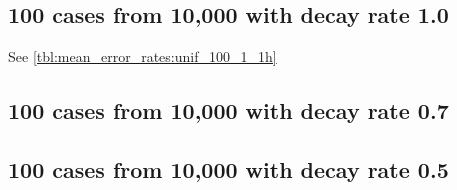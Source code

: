 \subsection{100 cases from 10,000 with decay rate 1.0}

See \autoref{tbl:mean_error_rates:unif_100_1_1h}
\begin{table}[H]
\centering
\scriptsize

    \begin{subtable}{0.5\textwidth}
    
    \caption{Means} 
    \end{subtable}%
    \begin{subtable}{0.5\textwidth}
    
    \caption{Standard deviations} 
    \end{subtable}

\caption{Error rates for uniform population of 10,000, single peak intensity of factor 100 and population decay rate 1.0}
\label{tbl:mean_error_rates:unif_100_1_1h:3}
\end{table}

\subsection{100 cases from 10,000 with decay rate 0.7}
\begin{table}[H]
\centering
\scriptsize

    \begin{subtable}{0.5\textwidth}
    
    \caption{Means} 
    \end{subtable}%
    \begin{subtable}{0.5\textwidth}
    
    \caption{Standard deviations} 
    \end{subtable}

\caption{Error rates for uniform population of 10,000, single peak intensity of factor 100 and decay rate 0.7}
\label{tbl:mean_error_rates:unif_100_0.7_1h}
\end{table}

\subsection{100 cases from 10,000 with decay rate 0.5}
\begin{table}[H]
\centering
\scriptsize

    \begin{subtable}{0.5\textwidth}
    
    \caption{Means} 
    \end{subtable}%
    \begin{subtable}{0.5\textwidth}
    
    \caption{Standard deviations} 
    \end{subtable}

\caption{Error rates for uniform population of 10,000, single peak intensity of factor 100 and decay rate 0.5}
\label{tbl:mean_error_rates:unif_100_0.5_1h}
\end{table}


